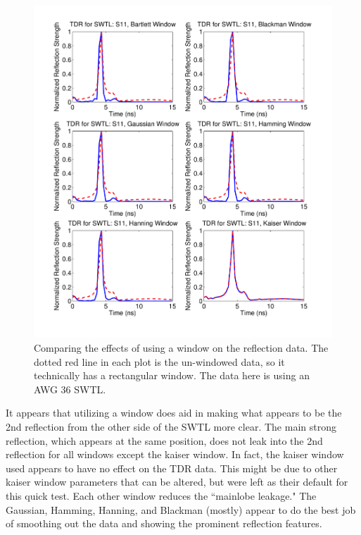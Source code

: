 \documentclass[12pt,onecolumn,titlepage]{article}
\begin{document}
\begin{figure}[htbp]
	\centering
	\includegraphics[width=\textwidth]{Pictures/22July2013/SWTL_TDR_s11_AWG36_windowing}
	\caption{ Comparing the effects of using a window on the reflection data. The dotted red line in each plot is the un-windowed data, so it technically has a rectangular window. The data here is using an AWG 36 SWTL. } 
	\label{fig:SWTL_TDR_s11_AWG36_windowing}
\end{figure}



It appears that utilizing a window does aid in making what appears to be the 2nd reflection from the other side of the SWTL more clear. The main strong reflection, which appears at the same position, does not leak into the 2nd reflection for all windows except the kaiser window. In fact, the kaiser window used appears to have no effect on the TDR data. This might be due to other kaiser window parameters that can be altered, but were left as their default for this quick test. Each other window reduces the ``mainlobe leakage." The Gaussian, Hamming, Hanning, and Blackman (mostly) appear to do the best job of smoothing out the data and showing the prominent reflection features. 
\end{document}
